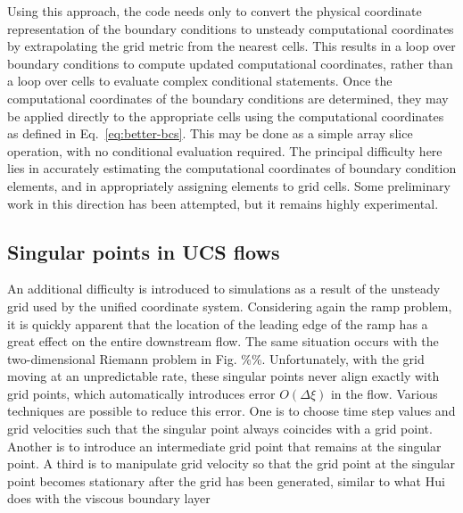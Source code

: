 Using this approach, the code needs only to convert the physical coordinate representation of the boundary conditions to unsteady computational coordinates by extrapolating the grid metric from the nearest cells. This results in a loop over boundary conditions to compute updated computational coordinates, rather than a loop over cells to evaluate complex conditional statements. Once the computational coordinates of the boundary conditions are determined, they may be applied directly to the appropriate cells using the computational coordinates as defined in Eq.~\ref{eq:better-bcs}. This may be done as a simple array slice operation, with no conditional evaluation required. The principal difficulty here lies in accurately estimating the computational coordinates of boundary condition elements, and in appropriately assigning elements to grid cells. Some preliminary work in this direction has been attempted, but it remains highly experimental.

\subsection{Singular points in UCS flows}
An additional difficulty is introduced to simulations as a result of the unsteady grid used by the unified coordinate system. Considering again the ramp problem, it is quickly apparent that the location of the leading edge of the ramp has a great effect on the entire downstream flow. The same situation occurs with the two-dimensional Riemann problem in Fig. \%\%. Unfortunately, with the grid moving at an unpredictable rate, these singular points never align exactly with grid points, which automatically introduces error 
$O\left( {\Delta \xi } \right)$ 
in the flow. Various techniques are possible to reduce this error. One is to choose time step values and grid velocities such that the singular point always coincides with a grid point. Another is to introduce an intermediate grid point that remains at the singular point. A third is to manipulate grid velocity so that the grid point at the singular point becomes stationary after the grid has been generated, similar to what Hui does with the viscous boundary layer\cite{Hui2007a}

